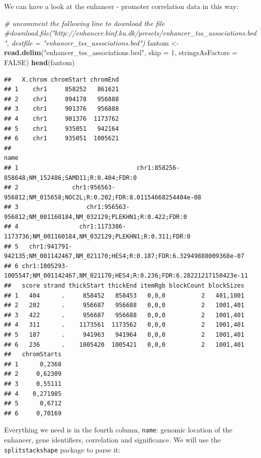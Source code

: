 \documentclass[9pt,a4paper,]{extarticle}
\newenvironment{Shaded}{\begin{snugshade}}{\end{snugshade}}
\newcommand{\KeywordTok}[1]{\textcolor[rgb]{0.13,0.29,0.53}{\textbf{#1}}}
\newcommand{\DataTypeTok}[1]{\textcolor[rgb]{0.13,0.29,0.53}{#1}}
\newcommand{\DecValTok}[1]{\textcolor[rgb]{0.00,0.00,0.81}{#1}}
\newcommand{\StringTok}[1]{\textcolor[rgb]{0.31,0.60,0.02}{#1}}
\newcommand{\CommentTok}[1]{\textcolor[rgb]{0.56,0.35,0.01}{\textit{#1}}}
\newcommand{\OtherTok}[1]{\textcolor[rgb]{0.56,0.35,0.01}{#1}}
\newcommand{\NormalTok}[1]{#1}
\begin{document}
We can have a look at the enhancer - promoter correlation data in this way:

\begin{Shaded}
\begin{Highlighting}[]
\CommentTok{# uncomment the following line to download the file}
\CommentTok{#download.file("http://enhancer.binf.ku.dk/presets/enhancer_tss_associations.bed", destfile = "enhancer_tss_associations.bed")}
\NormalTok{fantom <-}\StringTok{ }\KeywordTok{read.delim}\NormalTok{(}\StringTok{"enhancer_tss_associations.bed"}\NormalTok{, }\DataTypeTok{skip =} \DecValTok{1}\NormalTok{, }\DataTypeTok{stringsAsFactors =} \OtherTok{FALSE}\NormalTok{)}
\KeywordTok{head}\NormalTok{(fantom)}
\end{Highlighting}
\end{Shaded}

\begin{verbatim}
##   X.chrom chromStart chromEnd
## 1    chr1     858252   861621
## 2    chr1     894178   956888
## 3    chr1     901376   956888
## 4    chr1     901376  1173762
## 5    chr1     935051   942164
## 6    chr1     935051  1005621
##                                                                                name
## 1                                 chr1:858256-858648;NM_152486;SAMD11;R:0.404;FDR:0
## 2               chr1:956563-956812;NM_015658;NOC2L;R:0.202;FDR:8.01154668254404e-08
## 3                   chr1:956563-956812;NM_001160184,NM_032129;PLEKHN1;R:0.422;FDR:0
## 4                 chr1:1173386-1173736;NM_001160184,NM_032129;PLEKHN1;R:0.311;FDR:0
## 5   chr1:941791-942135;NM_001142467,NM_021170;HES4;R:0.187;FDR:6.32949888009368e-07
## 6 chr1:1005293-1005547;NM_001142467,NM_021170;HES4;R:0.236;FDR:6.28221217150423e-11
##   score strand thickStart thickEnd itemRgb blockCount blockSizes
## 1   404      .     858452   858453   0,0,0          2   401,1001
## 2   202      .     956687   956688   0,0,0          2   1001,401
## 3   422      .     956687   956688   0,0,0          2   1001,401
## 4   311      .    1173561  1173562   0,0,0          2   1001,401
## 5   187      .     941963   941964   0,0,0          2   1001,401
## 6   236      .    1005420  1005421   0,0,0          2   1001,401
##   chromStarts
## 1      0,2368
## 2     0,62309
## 3     0,55111
## 4    0,271985
## 5      0,6712
## 6     0,70169
\end{verbatim}

Everything we need is in the fourth column, \texttt{name}: genomic location of the enhancer, gene identifiers, correlation and significance.
We will use the \texttt{splitstackshape} package \citep{Mahto2014} to parse it:
\end{document}
